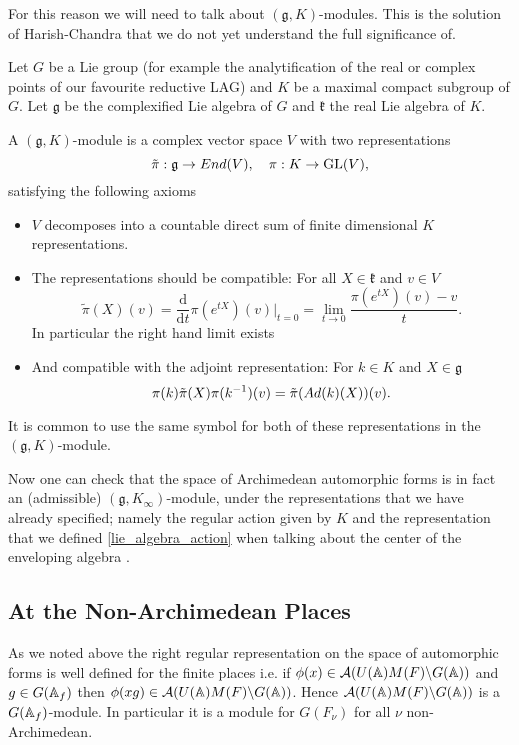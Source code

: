 For this reason we will need to talk about \((\mathfrak{g}, K)\)-modules. This is the solution of Harish-Chandra that we do not yet understand the full significance of. 

\begin{definition}
    Let \(G\) be a Lie group (for example the analytification of the real or complex points of our favourite reductive LAG) and \(K\) be a maximal compact subgroup of \(G\). Let \(\mathfrak{g}\) be the complexified Lie algebra of \(G\) and \(\mathfrak{k}\) the real Lie algebra of \(K\). 
    
    A \((\mathfrak{g}, K)\)-module is a complex vector space \(V\) with two representations 
    \[\tilde{\pi}: \mathfrak{g} \to End(V), \quad \pi: K\to \operatorname{GL}(V),\]
    satisfying the following axioms
    \begin{itemize}
        \item \(V\) decomposes into a countable direct sum of finite dimensional \(K\) representations.
        \item The representations should be compatible: For all \(X \in \mathfrak{k}\) and \(v\in V\)
        \[\tilde{\pi}(X)(v) = \frac{\mathrm{d}}{\mathrm{d}t}\pi(e^{tX})(v)|_{t=0} = \lim_{t\to 0}\frac{\pi(e^{tX})(v) - v}{t}.\]
        In particular the right hand limit exists
        \item And compatible with the adjoint representation: For \(k\in K\) and \(X\in \mathfrak{g}\) 
         \[\pi(k)\tilde{\pi}(X) \pi(k^{-1} )(v) = \tilde{\pi}(Ad(k)(X))(v).\]
    \end{itemize}
\end{definition}

\begin{remark}
    It is common to use the same symbol for both of these representations in the \((\mathfrak{g}, K)\)-module.
\end{remark}
Now one can check that the space of Archimedean automorphic forms is in fact an (admissible) \((\mathfrak{g}, K_\infty)\)-module, under the representations that we have already specified; namely the regular action given by \(K\) and the representation that we defined \ref{lie_algebra_action} when talking about the center of the enveloping algebra \cite[Thm. 6.2.6]{getzIntroductionAutomorphicRepresentations2024}.

\subsection{At the Non-Archimedean Places}
As we noted above the right regular representation on the space of automorphic forms is well defined for the finite places i.e. 
if \(\phi(x)\in \mathcal{A}(U(\A)M(F)\backslash G(\A))\) and \(g\in G(\A_f)\) then \(\phi(xg) \in \mathcal{A}(U(\A)M(F)\backslash G(\A)) \). Hence \(\mathcal{A}(U(\A)M(F)\backslash G(\A))\) is a \(G(\A_f)\)-module. In particular it is a module for \(G(F_\nu)\) for all \(\nu\) non-Archimedean.


